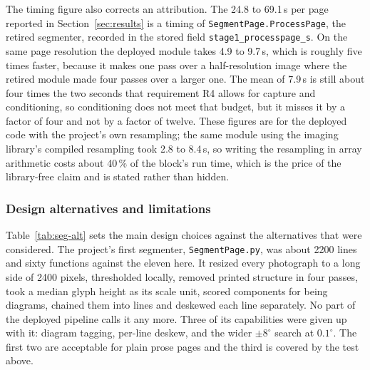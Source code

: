 The timing figure also corrects an attribution. The 24.8 to 69.1\,s per page reported in Section~\ref{sec:results} is a timing of \texttt{SegmentPage.ProcessPage}, the retired segmenter, recorded in the stored field \texttt{stage1\_processpage\_s}. On the same page resolution the deployed module takes 4.9 to 9.7\,s, which is roughly five times faster, because it makes one pass over a half-resolution image where the retired module made four passes over a larger one. The mean of 7.9\,s is still about four times the two seconds that requirement R4 allows for capture and conditioning, so conditioning does not meet that budget, but it misses it by a factor of four and not by a factor of twelve. These figures are for the deployed code with the project's own resampling; the same module using the imaging library's compiled resampling took 2.8 to 8.4\,s, so writing the resampling in array arithmetic costs about 40\,\% of the block's run time, which is the price of the library-free claim and is stated rather than hidden.

\subsubsection{Design alternatives and limitations}

Table~\ref{tab:seg-alt} sets the main design choices against the alternatives that were considered. The project's first segmenter, \texttt{SegmentPage.py}, was about 2200 lines and sixty functions against the eleven here. It resized every photograph to a long side of 2400 pixels, thresholded locally, removed printed structure in four passes, took a median glyph height as its scale unit, scored components for being diagrams, chained them into lines and deskewed each line separately. No part of the deployed pipeline calls it any more. Three of its capabilities were given up with it: diagram tagging, per-line deskew, and the wider $\pm8^\circ$ search at $0.1^\circ$. The first two are acceptable for plain prose pages and the third is covered by the test above.

